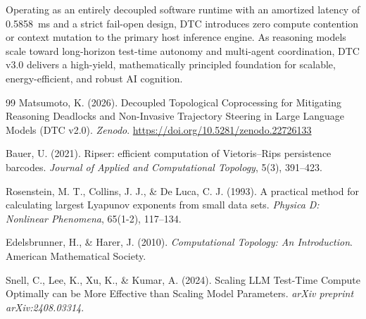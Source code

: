 \documentclass[11pt,a4paper]{article}
\begin{document}
Operating as an entirely decoupled software runtime with an amortized latency of 0.5858~ms and a strict fail-open design, DTC introduces zero compute contention or context mutation to the primary host inference engine. As reasoning models scale toward long-horizon test-time autonomy and multi-agent coordination, DTC v3.0 delivers a high-yield, mathematically principled foundation for scalable, energy-efficient, and robust AI cognition.

\begin{thebibliography}{99}
Matsumoto, K. (2026). Decoupled Topological Coprocessing for Mitigating Reasoning Deadlocks and Non-Invasive Trajectory Steering in Large Language Models (DTC v2.0). \textit{Zenodo}. \url{https://doi.org/10.5281/zenodo.22726133}

Bauer, U. (2021). Ripser: efficient computation of Vietoris--Rips persistence barcodes. \textit{Journal of Applied and Computational Topology}, 5(3), 391--423.

Rosenstein, M. T., Collins, J. J., \& De Luca, C. J. (1993). A practical method for calculating largest Lyapunov exponents from small data sets. \textit{Physica D: Nonlinear Phenomena}, 65(1-2), 117--134.

Edelsbrunner, H., \& Harer, J. (2010). \textit{Computational Topology: An Introduction}. American Mathematical Society.

Snell, C., Lee, K., Xu, K., \& Kumar, A. (2024). Scaling LLM Test-Time Compute Optimally can be More Effective than Scaling Model Parameters. \textit{arXiv preprint arXiv:2408.03314}.
\end{thebibliography}
\end{document}

